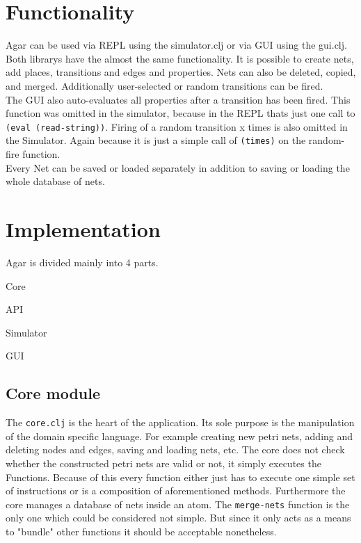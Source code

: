 \documentclass[twoside]{article}
\begin{document}
\begin{multicols}{2}

\section{Functionality}
Agar can be used via REPL using the simulator.clj or via GUI using the gui.clj.
Both librarys have the almost the same functionality.
It is possible to create nets, add places, transitions and edges and properties. Nets can also be 
deleted, copied, and merged. 
Additionally user-selected or random transitions can be fired.\\ 
The GUI also auto-evaluates all properties after a transition has been fired. This function was omitted in
the simulator, because in the REPL thats just one call to \texttt{(eval (read-string))}.
Firing of a random transition x times is also omitted in the Simulator. Again because it is just a simple
call of \texttt{(times)} on the random-fire function.\\
Every Net can be saved or loaded separately in addition to saving or loading the whole database of nets.

\section{Implementation}

Agar is divided mainly into 4 parts. 
\begin{compactitem}
\item Core
\item API
\item Simulator 
\item GUI
\end{compactitem}
\subsection{Core module}
The \texttt{core.clj} is the heart of the application. Its sole purpose is the manipulation of the
domain specific language. For example creating new petri nets, adding and deleting nodes and edges,
saving and loading nets, etc.
The core does not check whether the constructed petri nets are valid or not, it simply executes the Functions.
Because of this every function either just has to execute one simple set of instructions or is a composition of
aforementioned methods.
Furthermore the core manages a database of nets inside an atom. 
The \texttt{merge-nets} function is the only one which could be considered not simple. But since it only
acts as a means to "bundle" other functions it should be acceptable nonetheless.


\end{multicols}
\end{document}
